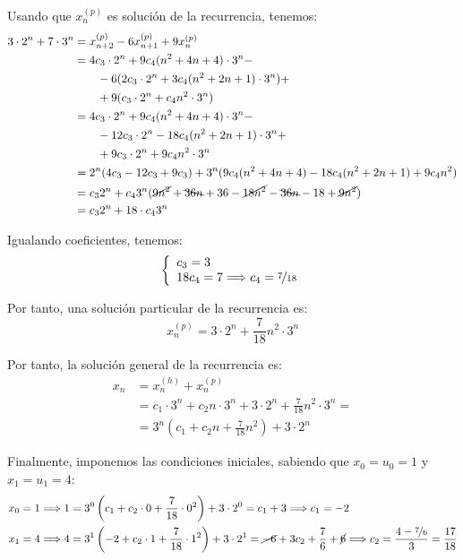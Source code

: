 \documentclass[12pt]{article}
\begin{document}
\begin{ejercicio}[Recurrencia]
        Usando que $x_n^{(p)}$ es solución de la recurrencia, tenemos:
        \begin{align*}
            3\cdot 2^n + 7\cdot 3^n &= x_{n+2}^{(p)} - 6x_{n+1}^{(p)} + 9x_n^{(p)} \\
            &= 4c_3\cdot 2^n + 9c_4(n^2+4n+4)\cdot 3^{n} -\\&\qquad - 6(2c_3\cdot 2^n + 3c_4(n^2+2n+1)\cdot 3^{n}) +\\&\qquad + 9(c_3\cdot 2^n + c_4n^2\cdot 3^{n}) \\
            &= 4c_3\cdot 2^n + 9c_4(n^2+4n+4)\cdot 3^{n} -\\&\qquad - 12c_3\cdot 2^n - 18c_4(n^2+2n+1)\cdot 3^{n} +\\&\qquad + 9c_3\cdot 2^n + 9c_4n^2\cdot 3^{n} \\
            &= 2^n (4c_3 - 12c_3 + 9c_3) + 3^n(9c_4(n^2+4n+4) - 18c_4(n^2+2n+1) + 9c_4n^2) \\
            &= c_32^n + c_43^n(\cancel{9n^2} + \bcancel{36n} + 36 - \cancel{18n^2} - \bcancel{36n} - 18 + \cancel{9n^2}) \\
            &= c_32^n + 18\cdot c_43^n
        \end{align*}
    
        Igualando coeficientes, tenemos:
        \begin{equation*}
            \left\{\begin{array}{l}
                c_3 = 3 \\
                18c_4 = 7 \Longrightarrow c_4 = \nicefrac{7}{18}
            \end{array}\right.
        \end{equation*}
    
        Por tanto, una solución particular de la recurrencia es:
        \begin{equation*}
            x_n^{(p)} = 3\cdot 2^n + \frac{7}{18}n^2\cdot 3^n
        \end{equation*}
    
        Por tanto, la solución general de la recurrencia es:
        \begin{align*}
            x_n &= x_n^{(h)} + x_n^{(p)} \\&= c_1\cdot 3^n + c_2n\cdot 3^n + 3\cdot 2^n + \frac{7}{18}n^2\cdot 3^n=\\
            &= 3^n\left(c_1 + c_2n + \frac{7}{18}n^2\right) + 3\cdot 2^n
        \end{align*}
    
        Finalmente, imponemos las condiciones iniciales, sabiendo que $x_0=u_0=1$ y $x_1=u_1=4$:
        \begin{align*}
            x_0 = 1 &\Longrightarrow 1 = 3^0\left(c_1 + c_2\cdot 0 + \frac{7}{18}\cdot 0^2\right) + 3\cdot 2^0 = c_1 + 3 \Longrightarrow c_1 = -2\\
            x_1 = 4 &\Longrightarrow 4 = 3^1\left(-2 + c_2\cdot 1 + \frac{7}{18}\cdot 1^2\right) + 3\cdot 2^1 = \cancel{-6} + 3c_2 + \frac{7}{6} + \cancel{6} \Longrightarrow c_2 = \dfrac{4-\nicefrac{7}{6}}{3} = \dfrac{17}{18}
        \end{align*}
    

\end{ejercicio}
\end{document}
